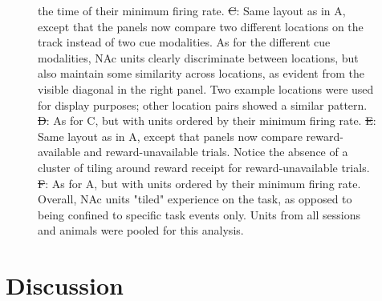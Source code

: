 \documentclass[11pt]{article}
\newcommand{\bsf}[1]{\textbf{#1}}
\providecommand{\DIFadd}[1]{{\protect\color{blue}\uwave{#1}}} %
\providecommand{\DIFdel}[1]{{\protect\color{red}\sout{#1}}}                      %
\providecommand{\DIFaddFL}[1]{\DIFadd{#1}} %
\providecommand{\DIFdelFL}[1]{\DIFdel{#1}} %
\providecommand{\DIFaddbeginFL}{} %
\providecommand{\DIFaddendFL}{} %
\providecommand{\DIFdelbeginFL}{} %
\providecommand{\DIFdelendFL}{} %
\newcommand{\DIFscaledelfig}{0.5}
\newlength{\DIFdelgraphicswidth} %
\newlength{\DIFdelgraphicsheight} %
\newcommand{\DIFaddincludegraphics}[2][]{{\color{blue}\fbox{\DIFOincludegraphics[#1]{#2}}}} %
\newcommand{\DIFdelincludegraphics}[2][]{%
\sbox{\DIFdelgraphicsbox}{\DIFOincludegraphics[#1]{#2}}%
\settoboxwidth{\DIFdelgraphicswidth}{\DIFdelgraphicsbox} %
\settoboxtotalheight{\DIFdelgraphicsheight}{\DIFdelgraphicsbox} %
\scalebox{\DIFscaledelfig}{%
\parbox[b]{\DIFdelgraphicswidth}{\usebox{\DIFdelgraphicsbox}\\[-\baselineskip] \rule{\DIFdelgraphicswidth}{0em}}\llap{\resizebox{\DIFdelgraphicswidth}{\DIFdelgraphicsheight}{%
\setlength{\unitlength}{\DIFdelgraphicswidth}%
\begin{picture}(1,1)%
\thicklines\linethickness{2pt} %
{\color[rgb]{1,0,0}\put(0,0){\framebox(1,1){}}}%
{\color[rgb]{1,0,0}\put(0,0){\line( 1,1){1}}}%
{\color[rgb]{1,0,0}\put(0,1){\line(1,-1){1}}}%
\end{picture}%
}\hspace*{3pt}}} %
} %
\DeclareRobustCommand{\DIFaddbeginFL}{\DIFOaddbeginFL \let\includegraphics\DIFaddincludegraphics} %
\DeclareRobustCommand{\DIFaddendFL}{\DIFOaddendFL \let\includegraphics\DIFOincludegraphics} %
\DeclareRobustCommand{\DIFdelbeginFL}{\DIFOdelbeginFL \let\includegraphics\DIFdelincludegraphics} %
\DeclareRobustCommand{\DIFdelendFL}{\DIFOaddendFL \let\includegraphics\DIFOincludegraphics} %
\begin{document}
{\begin{figure}
{  the time of their minimum firing rate. \DIFdelbeginFL \DIFdelFL{C}\DIFdelendFL \DIFaddbeginFL \DIFaddFL{\bsf{C}}\DIFaddendFL : Same layout as in A, except
  that the panels now compare two different locations on the track instead of
  two cue modalities. As for the different cue modalities, NAc units clearly
  discriminate between locations, but also maintain some similarity across
  locations, as evident from the visible diagonal in the right panel. Two
  example locations were used for display purposes; other location pairs showed
  a similar pattern. \DIFdelbeginFL \DIFdelFL{D}\DIFdelendFL \DIFaddbeginFL \DIFaddFL{\bsf{D}}\DIFaddendFL : As for C, but with units ordered by their minimum
  firing rate. \DIFdelbeginFL \DIFdelFL{E}\DIFdelendFL \DIFaddbeginFL \DIFaddFL{\bsf{E}}\DIFaddendFL : Same layout as in A, except that panels now compare
  reward-available and reward-unavailable trials. Notice the absence of a
  cluster of tiling around reward receipt for reward-unavailable
  trials. \DIFdelbeginFL \DIFdelFL{F}\DIFdelendFL \DIFaddbeginFL \DIFaddFL{\bsf{F}}\DIFaddendFL : As for A, but with units ordered by their minimum firing
  rate. Overall, NAc units "tiled" experience on the task, as opposed to being
  confined to specific task events only. Units from all sessions and animals
  were pooled for this analysis.}
\label{fig:NP_tiling}

\end{figure}
\section*{Discussion}

}
\end{document}
